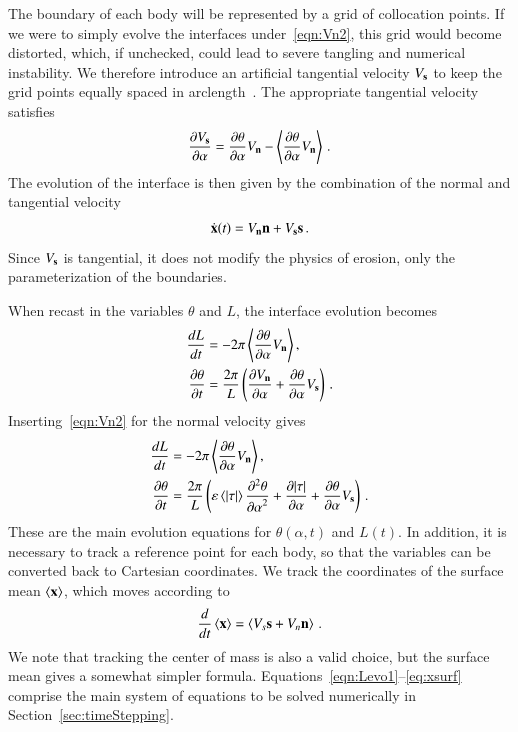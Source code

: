 \documentclass[preprint, 10pt]{elsarticle}
\begin{document}
The boundary of each body will be represented by a grid of collocation
points. If we were to simply evolve the interfaces
under~\eqref{eqn:Vn2}, this grid would become distorted, which, if
unchecked, could lead to severe tangling and numerical instability. We
therefore introduce an artificial tangential velocity $V_{\mathbf{s}}$ to keep the grid points equally spaced in arclength~\cite{hou-low-she1994}. The appropriate tangential velocity satisfies 
\begin{align}
\frac{\partial V_{\mathbf{s}}}{\partial \alpha} = \frac{\partial \theta}{\partial \alpha} V_{\mathbf{n}} - \left< \frac{\partial \theta}{\partial \alpha} V_{\mathbf{n}} \right> \, .
\end{align}
The evolution of the interface is then given by the combination of the normal and tangential velocity
\begin{align}
\dot{{\mathbf{x}}}(t) = V_{\mathbf{n}} {\mathbf{n}} + V_{\mathbf{s}} {\mathbf{s}} \, .
\end{align}
Since $V_{\mathbf{s}}$ is tangential, it does not modify the physics of erosion, only the parameterization of the boundaries.

When recast in the variables $\theta$ and $L$, the interface evolution becomes
\begin{align}
\frac{d L}{d t} &= - 2 \pi \left< \frac{\partial \theta}{\partial \alpha} V_{\mathbf{n}} \right>, \\
\frac{\partial \theta}{\partial t} &= \frac{2 \pi}{L} \left( \frac{\partial V_{\mathbf{n}}}{\partial \alpha} +
\frac{\partial \theta}{\partial \alpha} V_{\mathbf{s}} \right) \, .
\end{align}
Inserting~\eqref{eqn:Vn2} for the normal velocity gives
\begin{align}
\label{eqn:Levo1}
\frac{d L}{d t} &= - 2 \pi \left< \frac{\partial \theta}{\partial \alpha} V_{\mathbf{n}} \right>, \\
\label{eqn:thetaevo1}
\frac{\partial \theta}{\partial t} &= \frac{2\pi}{L} \left(
\varepsilon \left< \lvert \tau \rvert \right> \frac{\partial^2 \theta}{{\partial \alpha}^2} + \frac{\partial \lvert \tau \rvert}{\partial \alpha} +
\frac{\partial \theta}{\partial \alpha} V_{\mathbf{s}} \right)\,.
\end{align}
These are the main evolution equations for $\theta(\alpha,t)$ and $L(t)$.
In addition, it is necessary to track a reference point for each body, so that the {\thL} variables can be converted back to Cartesian coordinates. We track the coordinates of the surface mean $\left< {\mathbf{x}} \right>$, which moves according to
\begin{align}
\label{eq:xsurf}
\frac{d}{dt} \left< {\mathbf{x}} \right> = \left<  V_s {\mathbf{s}} + V_n {\mathbf{n}}  \right> \, .
\end{align}
We note that tracking the center of mass is also a valid choice, but the surface mean gives a somewhat simpler formula. Equations~\eqref{eqn:Levo1}--\eqref{eq:xsurf} comprise the main system of equations to be solved numerically in Section~\ref{sec:timeStepping}. 
\end{document}
